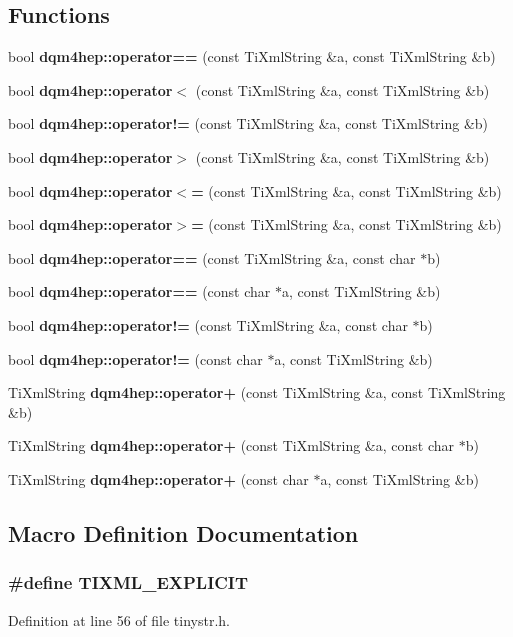 \subsection*{Functions}
\begin{DoxyCompactItemize}
\item 
bool {\bf dqm4hep\+::operator==} (const Ti\+Xml\+String \&a, const Ti\+Xml\+String \&b)
\item 
bool {\bf dqm4hep\+::operator$<$} (const Ti\+Xml\+String \&a, const Ti\+Xml\+String \&b)
\item 
bool {\bf dqm4hep\+::operator!=} (const Ti\+Xml\+String \&a, const Ti\+Xml\+String \&b)
\item 
bool {\bf dqm4hep\+::operator$>$} (const Ti\+Xml\+String \&a, const Ti\+Xml\+String \&b)
\item 
bool {\bf dqm4hep\+::operator$<$=} (const Ti\+Xml\+String \&a, const Ti\+Xml\+String \&b)
\item 
bool {\bf dqm4hep\+::operator$>$=} (const Ti\+Xml\+String \&a, const Ti\+Xml\+String \&b)
\item 
bool {\bf dqm4hep\+::operator==} (const Ti\+Xml\+String \&a, const char $\ast$b)
\item 
bool {\bf dqm4hep\+::operator==} (const char $\ast$a, const Ti\+Xml\+String \&b)
\item 
bool {\bf dqm4hep\+::operator!=} (const Ti\+Xml\+String \&a, const char $\ast$b)
\item 
bool {\bf dqm4hep\+::operator!=} (const char $\ast$a, const Ti\+Xml\+String \&b)
\item 
Ti\+Xml\+String {\bf dqm4hep\+::operator+} (const Ti\+Xml\+String \&a, const Ti\+Xml\+String \&b)
\item 
Ti\+Xml\+String {\bf dqm4hep\+::operator+} (const Ti\+Xml\+String \&a, const char $\ast$b)
\item 
Ti\+Xml\+String {\bf dqm4hep\+::operator+} (const char $\ast$a, const Ti\+Xml\+String \&b)
\end{DoxyCompactItemize}


\subsection{Macro Definition Documentation}
\subsubsection[{T\+I\+X\+M\+L\+\_\+\+E\+X\+P\+L\+I\+C\+I\+T}]{\setlength{\rightskip}{0pt plus 5cm}\#define T\+I\+X\+M\+L\+\_\+\+E\+X\+P\+L\+I\+C\+I\+T}\label{tinystr_8h_ae341476cd6b94ee32e3e93110a759581}


Definition at line 56 of file tinystr.\+h.

